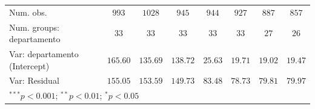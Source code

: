 \begin{tabular}{l c c c c c c c}
Num. obs.                           & $993$         & $1028$        & $945$         & $944$         & $927$         & $887$         & $857$        \\
Num. groups: departamento           & $33$          & $33$          & $33$          & $33$          & $33$          & $27$          & $26$         \\
Var: departamento (Intercept)       & $165.60$      & $135.69$      & $138.72$      & $25.63$       & $19.71$       & $19.02$       & $19.47$      \\
Var: Residual                       & $155.05$      & $153.59$      & $149.73$      & $83.48$       & $78.73$       & $79.81$       & $79.97$      \\
\bottomrule
\multicolumn{8}{l}{\scriptsize{$^{***}p<0.001$; $^{**}p<0.01$; $^{*}p<0.05$}}
\end{tabular}
